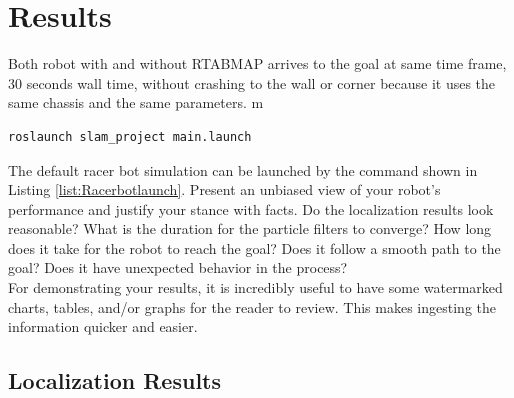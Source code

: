 \documentclass[10pt,journal,compsoc]{IEEEtran}
\begin{document}
\section{Results}
Both robot with and without RTABMAP arrives to the goal at same time frame, 30 seconds wall time, without crashing to the wall or corner because it uses the same chassis and the same parameters.
m
\begin{lstlisting}[language={[Sharp]C}, caption={racerbot launch command},label={list:Racerbotlaunch}]
      roslaunch slam_project main.launch
\end{lstlisting}
The default racer bot simulation can be launched by the command shown in Listing \ref{list:Racerbotlaunch}.
Present an unbiased view of your robot's performance and justify your stance with facts. Do the localization results look reasonable? What is the duration for the particle filters to converge? How long does it take for the robot to reach the goal? Does it follow a smooth path to the goal? Does it have unexpected behavior in the process? \\
For demonstrating your results, it is incredibly useful to have some watermarked charts, tables, and/or graphs for the reader to review. This makes ingesting the information quicker and easier.
\subsection{Localization Results}
\end{document}
